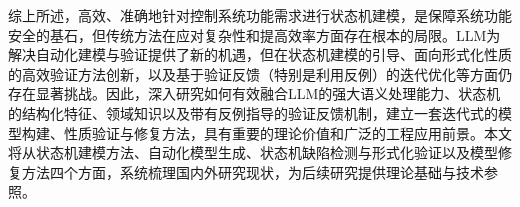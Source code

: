 综上所述，高效、准确地针对控制系统功能需求进行状态机建模，是保障系统功能安全的基石，但传统方法在应对复杂性和提高效率方面存在根本的局限。LLM为解决自动化建模与验证提供了新的机遇，但在状态机建模的引导、面向形式化性质的高效验证方法创新，以及基于验证反馈（特别是利用反例）的迭代优化等方面仍存在显著挑战。因此，深入研究如何有效融合LLM的强大语义处理能力、状态机的结构化特征、领域知识以及带有反例指导的验证反馈机制，建立一套迭代式的模型构建、性质验证与修复方法，具有重要的理论价值和广泛的工程应用前景。本文将从状态机建模方法、自动化模型生成、状态机缺陷检测与形式化验证以及模型修复方法四个方面，系统梳理国内外研究现状，为后续研究提供理论基础与技术参照。